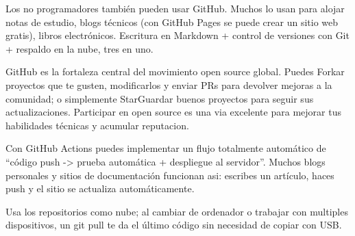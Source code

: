 
Los no programadores también pueden usar GitHub. Muchos lo usan para alojar notas de estudio, blogs técnicos (con GitHub Pages se puede crear un sitio web gratis), libros electrónicos. Escritura en Markdown + control de versiones con Git + respaldo en la nube, tres en uno.


GitHub es la fortaleza central del movimiento open source global. Puedes Forkar proyectos que te gusten, modificarlos y enviar PRs para devolver mejoras a la comunidad; o simplemente StarGuardar buenos proyectos para seguir sus actualizaciones. Participar en open source es una via excelente para mejorar tus habilidades técnicas y acumular reputacion.


Con GitHub Actions puedes implementar un flujo totalmente automático de “código push -> prueba automática + despliegue al servidor”. Muchos blogs personales y sitios de documentación funcionan asi: escribes un artículo, haces push y el sitio se actualiza automáticamente.


Usa los repositorios como nube; al cambiar de ordenador o trabajar con multiples dispositivos, un git pull te da el último código sin necesidad de copiar con USB.


